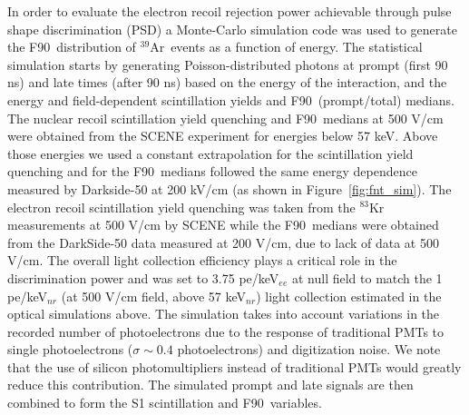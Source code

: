 \documentclass[a4paper,11pt]{article}
\newcommand{\artn}{$^{39}$Ar}
\newcommand{\fnt}{F90}
\newcommand{\psd}{PSD}
\begin{document}
In order to evaluate the electron recoil rejection power achievable through pulse shape discrimination (\psd) a Monte-Carlo simulation code was used to generate the \fnt~distribution of \artn~events as a function of energy. The statistical simulation starts by generating Poisson-distributed photons at prompt (first 90 ns) and late times (after 90 ns) based on the energy of the interaction, and the energy and field-dependent scintillation yields and \fnt~(prompt/total) medians. The nuclear recoil scintillation yield quenching and \fnt~medians at 500 V/cm were obtained from the SCENE experiment \cite{cao2015measurement, cao2014study} for energies below 57 keV. Above those energies we used a constant extrapolation for the scintillation yield quenching and for the \fnt~medians followed the same energy dependence measured by Darkside-50 at 200 kV/cm \cite{agnes2018darkside} (as shown in Figure~\ref{fig:fnt_sim}). The electron recoil scintillation yield quenching was taken from the $^{83}$Kr measurements at 500 V/cm by SCENE \cite{cao2015measurement, cao2014study} while the \fnt~medians were obtained from the DarkSide-50 data \cite{agnes2015first} measured at 200 V/cm, due to lack of data at 500 V/cm. The overall light collection efficiency plays a critical role in the discrimination power and was set to 3.75 pe/keV$_{ee}$ at null field to match the 1 pe/keV$_{nr}$ (at 500 V/cm field, above 57 keV$_{nr}$) light collection estimated in the optical simulations above. The simulation takes into account variations in the recorded number of photoelectrons due to the response of traditional PMTs to single photoelectrons ($\sigma \sim 0.4$ photoelectrons) and digitization noise. We note that the use of silicon photomultipliers instead of traditional PMTs would greatly reduce this contribution. The simulated prompt and late signals are then combined to form the S1 scintillation and \fnt~variables. 
\end{document}
